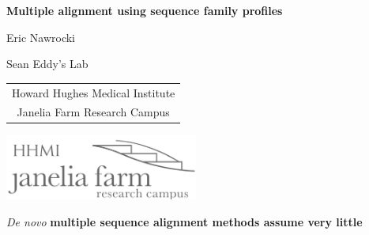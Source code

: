 \documentclass[landscape]{slides}
\begin{document}
\begin{slide}
\begin{center}
\large{\textbf{Multiple alignment using sequence family profiles}}

\normalsize

Eric Nawrocki

Sean Eddy's Lab

\medskip

\medskip

\small

\begin{tabular}{c}
Howard Hughes Medical Institute \\ 
Janelia Farm Research Campus \\
\end{tabular}

\vspace{0.1in}

\includegraphics[width=2.5in]{figs/janelia-logo}
\end{center}
\end{slide}
\begin{slide}
\begin{center}
\emph{De novo} \textbf{multiple sequence alignment methods assume very little}
\end{center}


\vfill
\end{slide}
\end{document}
